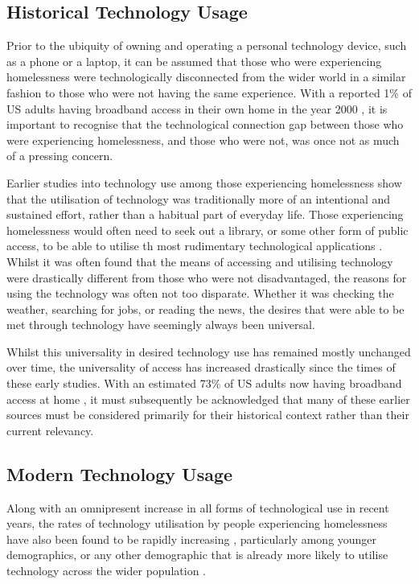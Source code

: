 \subsection{Historical Technology Usage}

Prior to the ubiquity of owning and operating a personal technology device, such as a phone or a laptop, it can be assumed that those who were experiencing homelessness were technologically disconnected from the wider world in a similar fashion to those who were not having the same experience. With a reported 1\% of US adults having broadband access in their own home in the year 2000 \cite{smith_2017}, it is important to recognise that the technological connection gap between those who were experiencing homelessness, and those who were not, was once not as much of a pressing concern.

Earlier studies into technology use among those experiencing homelessness show that the utilisation of technology was traditionally more of an intentional and sustained effort, rather than a habitual part of everyday life. Those experiencing homelessness would often need to seek out a library, or some other form of public access, to be able to utilise th most rudimentary technological applications \cite{eyrich2011sheltered} \cite{le2008designs}. Whilst it was often found that the means of accessing and utilising technology were drastically different from those who were not disadvantaged, the reasons for using the technology was often not too disparate. Whether it was checking the weather, searching for jobs, or reading the news, the desires that were able to be met through technology have seemingly always been universal.

Whilst this universality in desired technology use has remained mostly unchanged over time, the universality of access has increased drastically since the times of these early studies. With an estimated 73\% of US adults now having broadband access at home \cite{smith_2017}, it must subsequently be acknowledged that many of these earlier sources must be considered primarily for their historical context rather than their current relevancy.

\subsection{Modern Technology Usage}

Along with an omnipresent increase in all forms of technological use in recent years, the rates of technology utilisation by people experiencing homelessness have also been found to be rapidly increasing \cite{rhoades2017no} \cite{eyrich2011sheltered} \cite{pollio2013technology}, particularly among younger demographics, or any other demographic that is already more likely to utilise technology across the wider population \cite{woelfer2010homeless}.

